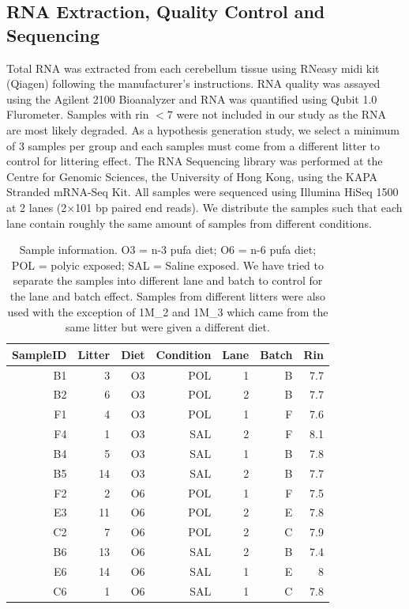 \documentclass[12pt]{scrbook}
\begin{document}
\subsection{RNA Extraction, Quality Control and Sequencing}
Total RNA was extracted from each cerebellum tissue using RNeasy midi kit (Qiagen) following the manufacturer's instructions.
RNA quality was assayed using the Agilent 2100 Bioanalyzer and RNA was quantified using Qubit 1.0 Flurometer.
Samples with \gls{rin} $<7$ were not included in our study as the RNA are most likely degraded.
As a hypothesis generation study, we select a minimum of 3 samples per group and each samples must come from a different litter to control for littering effect.
The RNA Sequencing library was performed at the Centre for Genomic Sciences, the University of Hong Kong, using the KAPA Stranded mRNA-Seq Kit. 
All samples were sequenced using Illumina HiSeq 1500 at 2 lanes (2$\times$101 \gls{bp} paired end reads).
We distribute the samples such that each lane contain roughly the same amount of samples from different conditions.
\begin{table}
	\centering
	\begin{tabular}{rrrrrrr}
		\toprule
		SampleID & Litter & Diet & Condition & Lane & Batch & Rin\\
		\midrule
		B1&	3&	O3&	POL&	1&	B&	7.7\\
		B2&	6&	O3&	POL&	2&	B&	7.7\\
		F1&	4&	O3&	POL&	1&	F&	7.6\\
		F4&	1&	O3&	SAL&	2&	F&	8.1\\
		B4&	5&	O3&	SAL&	1&	B&	7.8\\
		B5&	14&	O3&	SAL&	2&	B&	7.7\\
		F2&	2&	O6&	POL&	1&	F&	7.5\\
		E3&	11&	O6&	POL&	2&	E&	7.8\\
		C2&	7&	O6&	POL&	2&	C&	7.9\\
		B6&	13&	O6&	SAL&	2&	B&	7.4\\
		E6&	14&	O6&	SAL&	1&	E&	8\\
		C6&	1&	O6&	SAL&	1&	C&	7.8\\
		\bottomrule
	\end{tabular}
	\caption[Sample Information]{
		Sample information.
		O3 = n-3 \gls{pufa} diet; O6 = n-6 \gls{pufa} diet; POL = \gls{polyic} exposed; SAL = Saline exposed.
		We have tried to separate the samples into different lane and batch to control for the lane and batch effect. 
		Samples from different litters were also used with the exception of 1M\_2 and 1M\_3 which came from the same litter but were given a different diet.
		\label{tab:sampleInfo}
	}
\end{table}
\end{document}
